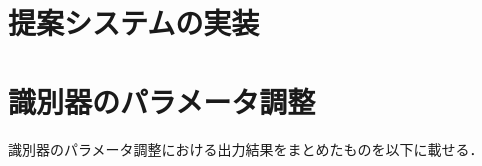 \appendix

\chapter{提案システムの実装}












\chapter{識別器のパラメータ調整}
識別器のパラメータ調整における出力結果をまとめたものを以下に載せる．

